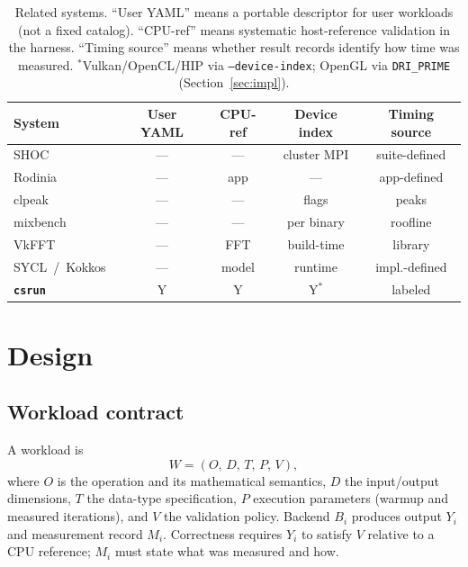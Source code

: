 \documentclass[11pt,a4paper]{article}
\newcommand{\csrun}{\texttt{csrun}\xspace}
\newcommand{\yes}{Y}
\newcommand{\no}{---}
\begin{document}
\begin{table}[htbp]
\centering
\small
\begin{tabular}{@{}lcccc@{}}
\toprule
System & User YAML & CPU-ref & Device index & Timing source \\
\midrule
SHOC~\cite{danalis2010shoc}     & \no & \no  & cluster MPI & suite-defined \\
Rodinia~\cite{che2009rodinia}   & \no & app  & \no         & app-defined \\
clpeak~\cite{clpeak2026}        & \no & \no  & flags       & peaks \\
mixbench~\cite{konstantinidis2015mixbench} & \no & \no & per binary & roofline \\
VkFFT~\cite{vkfft2021}          & \no & FFT  & build-time  & library \\
SYCL~/~Kokkos~\cite{sycl2020,trott2022kokkos} & \no & model & runtime & impl.-defined \\
\textbf{\csrun}                 & \yes & \yes & \yes$^\ast$ & labeled \\
\bottomrule
\end{tabular}
\caption{Related systems. ``User YAML'' means a portable descriptor for
user workloads (not a fixed catalog). ``CPU-ref'' means systematic
host-reference validation in the harness. ``Timing source'' means whether
result records identify how time was measured.
$^\ast$Vulkan/OpenCL/HIP via \texttt{--device-index}; OpenGL via
\texttt{DRI\_PRIME} (Section~\ref{sec:impl}).}
\label{tab:related}
\end{table}
\FloatBarrier

\section{Design}
\label{sec:design}

\subsection{Workload contract}

A workload is
\[
W = (O,\, D,\, T,\, P,\, V),
\]
where $O$ is the operation and its mathematical semantics, $D$ the
input/output dimensions, $T$ the data-type specification, $P$ execution
parameters (warmup and measured iterations), and $V$ the validation policy.
Backend $B_i$ produces output $Y_i$ and measurement record $M_i$. Correctness
requires $Y_i$ to satisfy $V$ relative to a CPU reference; $M_i$ must state
what was measured and how.
\end{document}
